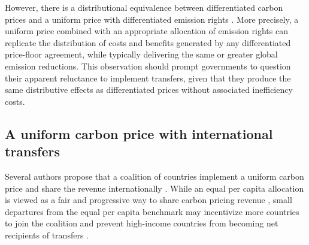 \documentclass[12pt,english]{article}
\begin{document}
However, there is a distributional equivalence between differentiated carbon prices and a uniform price with differentiated emission rights \citep{fabre_global_2025}. %
More precisely, a uniform price combined with an appropriate allocation of emission rights can replicate the distribution of costs and benefits generated by any differentiated price-floor agreement, while typically delivering the same or greater global emission reductions. 
This observation should prompt governments to question their apparent reluctance to implement transfers, %
given that they produce the same distributive effects as differentiated prices without associated inefficiency costs. 

\subsection{A uniform carbon price with international transfers}

Several authors propose that a coalition of countries implement a uniform carbon price and share the revenue internationally \citep{grubb_greenhouse_1990,bertram_tradeable_1992,jamieson_climate_2001,cramton_global_2017,blanchard_major_2021,rajan_global_2021,fabre_global_2024}. While an equal per capita allocation is viewed as a fair and progressive way to share carbon pricing revenue \citep{grubb_greenhouse_1990,gollier_negotiating_2015}, small departures from the equal per capita benchmark may incentivize more countries to join the coalition and prevent high-income countries from becoming net recipients of transfers \citep{fabre_global_2024}. 
\end{document}
